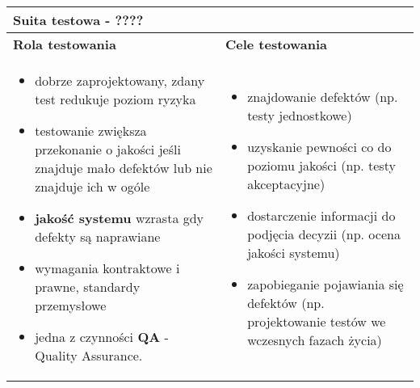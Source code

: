 \documentclass[../main.tex]{subfiles}
\begin{document}
\begin{table}[H]
\begin{center}
\begin{tabular}{| p{8cm}| p{8cm}|}
                \textbf{Suita testowa} - ????
                \\
                \hline
                \textbf{Rola testowania} & \textbf{Cele testowania}\\
                \hline
                \begin{itemize}
                    \item dobrze zaprojektowany, zdany test
                    redukuje poziom ryzyka
                    \item testowanie zwiększa przekonanie o
                    jakości jeśli znajduje mało defektów
                    lub nie znajduje ich w ogóle
                    \item \textbf{jakość systemu} wzrasta gdy defekty są naprawiane
                    \item wymagania kontraktowe i prawne, standardy przemysłowe
                    \item jedna z czynności \textbf{QA} - Quality Assurance.
                \end{itemize}
                &
                \begin{itemize}
                    \item znajdowanie defektów (np. testy jednostkowe)
                    \item uzyskanie pewności co do poziomu jakości (np. testy akceptacyjne)
                    \item dostarczenie informacji do podjęcia decyzii (np. ocena jakości systemu)
                    \item zapobieganie pojawiania się defektów (np. projektowanie testów we wczesnych fazach życia)
                \end{itemize}


\end{tabular}
\end{center}
\end{table}
\end{document}
